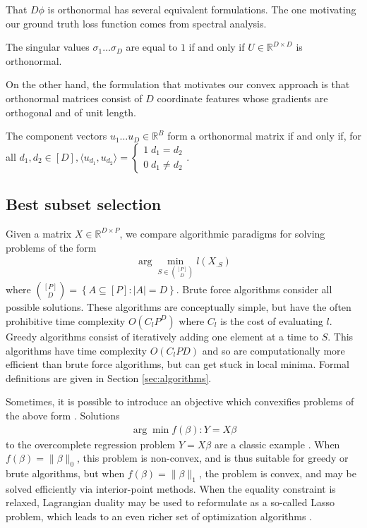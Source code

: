 That $D\phi$ is orthonormal has several equivalent formulations.
The one motivating our ground truth loss function comes from spectral analysis.
\begin{proposition}
\label{prop:orthonormal_spectrum}
The singular values $\sigma_1 \dots \sigma_D$ are equal to $1$ if and only if $U \in \mathbb{R}^{D \times D}$ is orthonormal.
\end{proposition}
On the other hand, the formulation that motivates our convex approach is that orthonormal matrices consist of $D$ coordinate features whose gradients are orthogonal and of unit length.
\begin{proposition}
\label{prop:orthonormal_basis}
The component vectors $u_1 \dots u_D \in \mathbb R^B$ form a orthonormal matrix if and only if, for all $d_1, d_2 \in [D], \langle u_{d_1}, u_{d_2} \rangle = \begin{cases}
1 \; d_1 = d_2 \\ 
0 \; d_1 \neq d_2 
\end{cases}$.
\end{proposition}


\subsection{Best subset selection}

Given a matrix $ X \in \mathbb R^{D \times P}$, we compare algorithmic paradigms for solving problems of the form
\begin{align}
\label{prog:ground_truth}
\arg \min_{ S \in \binom{[P]}{D}} l ( X_{. S})
\end{align}
where $\binom{[P]}{D} = \left\{ A \subseteq [P] : \left|A\right| = D \right\}$.
Brute force algorithms consider all possible solutions.
These algorithms are conceptually simple, but have the often prohibitive time complexity $O(C_lP^D)$ where $C_l$ is the cost of evaluating $l$.
Greedy algorithms consist of iteratively adding one element at a time to $ S$.
This algorithms have time complexity $O(C_lPD)$ and so are computationally more efficient than brute force algorithms, but can get stuck in local minima.
Formal definitions are given in Section \ref{sec:algorithms}.

Sometimes, it is possible to introduce an objective which convexifies problems of the above form  \citep{Liberti2004-iu, Abdi2013-th, Zhou2021-zz}.
Solutions
\begin{align}
\arg \min f(\beta) : Y  = X\beta 
\end{align}
to the overcomplete regression problem $Y = X \beta$ are a classic example \citep{Chen2001-hh}.
When $f(\beta) = \|\beta\|_0$, this problem is non-convex, and is thus suitable for greedy or brute algorithms, but when $f(\beta) =\|\beta\|_1$, the problem is convex, and may be solved efficiently via interior-point methods.
When the equality constraint is relaxed, Lagrangian duality may be used to reformulate as a so-called Lasso problem, which leads to an even richer set of optimization algorithms \citep{Hastie2016-cn}. %


